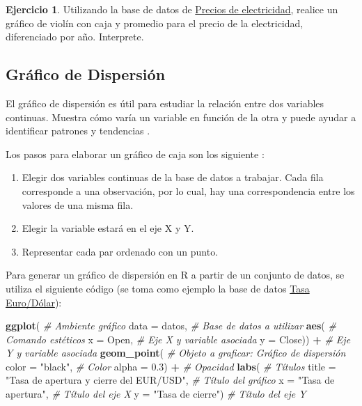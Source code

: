 \documentclass[
  11pt,
]{book}
\newenvironment{Shaded}{\begin{snugshade}}{\end{snugshade}}
\newcommand{\AttributeTok}[1]{\textcolor[rgb]{0.13,0.29,0.53}{#1}}
\newcommand{\CommentTok}[1]{\textcolor[rgb]{0.56,0.35,0.01}{\textit{#1}}}
\newcommand{\FloatTok}[1]{\textcolor[rgb]{0.00,0.00,0.81}{#1}}
\newcommand{\FunctionTok}[1]{\textcolor[rgb]{0.13,0.29,0.53}{\textbf{#1}}}
\newcommand{\NormalTok}[1]{#1}
\newcommand{\SpecialCharTok}[1]{\textcolor[rgb]{0.81,0.36,0.00}{\textbf{#1}}}
\newcommand{\StringTok}[1]{\textcolor[rgb]{0.31,0.60,0.02}{#1}}
\providecommand{\tightlist}{%
  \setlength{\itemsep}{0pt}\setlength{\parskip}{0pt}}
\theoremstyle{definition}
\theoremstyle{definition}
\theoremstyle{definition}
\newtheorem{exercise}{Ejercicio}[chapter]
\theoremstyle{definition}
\theoremstyle{remark}
\begin{document}
\begin{exercise}
Utilizando la base de datos de \hyperref[PreciosElectricidad]{Precios de electricidad}, realice un gráfico de violín con caja y promedio para el precio de la electricidad, diferenciado por año. Interprete.
\end{exercise}

\subsection{Gráfico de Dispersión}\label{gruxe1fico-de-dispersiuxf3n}

El gráfico de dispersión es útil para estudiar la relación entre dos variables continuas. Muestra cómo varía un variable en función de la otra y puede ayudar a identificar patrones y tendencias \citep{rowlingson2016data}.

Los pasos para elaborar un gráfico de caja son los siguiente \citep{healy2019data}:

\begin{enumerate}
\def\labelenumi{\arabic{enumi}.}
\tightlist
\item
  Elegir dos variables continuas de la base de datos a trabajar. Cada fila corresponde a una observación, por lo cual, hay una correspondencia entre los valores de una misma fila.
\item
  Elegir la variable estará en el eje X y Y.
\item
  Representar cada par ordenado con un punto.
\end{enumerate}

Para generar un gráfico de dispersión en R a partir de un conjunto de datos, se utiliza el siguiente código (se toma como ejemplo la base de datos \hyperref[TasaEURUSD]{Tasa Euro/Dólar}):

\begin{Shaded}
\begin{Highlighting}[]
\FunctionTok{ggplot}\NormalTok{( }\CommentTok{\# Ambiente gráfico}
  \AttributeTok{data =}\NormalTok{ datos, }\CommentTok{\# Base de datos a utilizar}
  \FunctionTok{aes}\NormalTok{( }\CommentTok{\# Comando estéticos}
    \AttributeTok{x =}\NormalTok{ Open, }\CommentTok{\# Eje X y variable asociada}
    \AttributeTok{y =}\NormalTok{ Close)) }\SpecialCharTok{+} \CommentTok{\# Eje Y y variable asociada}
  \FunctionTok{geom\_point}\NormalTok{( }\CommentTok{\# Objeto a graficar: Gráfico de dispersión}
    \AttributeTok{color =} \StringTok{"black"}\NormalTok{, }\CommentTok{\# Color}
    \AttributeTok{alpha =} \FloatTok{0.3}\NormalTok{) }\SpecialCharTok{+} \CommentTok{\# Opacidad}
  \FunctionTok{labs}\NormalTok{( }\CommentTok{\# Títulos}
    \AttributeTok{title =} \StringTok{"Tasa de apertura y cierre del EUR/USD"}\NormalTok{, }\CommentTok{\# Título del gráfico}
    \AttributeTok{x =} \StringTok{"Tasa de apertura"}\NormalTok{, }\CommentTok{\# Título del eje X}
    \AttributeTok{y =} \StringTok{"Tasa de cierre"}\NormalTok{) }\CommentTok{\# Título del eje Y}
\end{Highlighting}
\end{Shaded}
\end{document}
